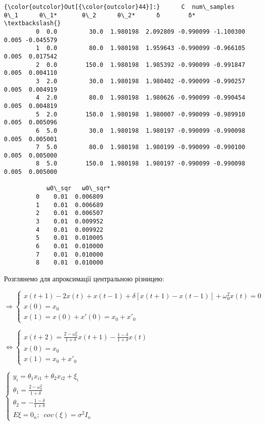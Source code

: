 \documentclass[11pt]{article}
\begin{document}
\begin{Verbatim}[commandchars=\\\{\}]
{\color{outcolor}Out[{\color{outcolor}44}]:}      C  num\_samples       θ\_1      θ\_1*       θ\_2      θ\_2*      δ        δ*  \textbackslash{}
         0  0.0         30.0  1.980198  2.092809 -0.990099 -1.100300  0.005 -0.045579   
         1  0.0         80.0  1.980198  1.959643 -0.990099 -0.966105  0.005  0.017542   
         2  0.0        150.0  1.980198  1.985392 -0.990099 -0.991847  0.005  0.004110   
         3  2.0         30.0  1.980198  1.980402 -0.990099 -0.990257  0.005  0.004919   
         4  2.0         80.0  1.980198  1.980626 -0.990099 -0.990454  0.005  0.004819   
         5  2.0        150.0  1.980198  1.980007 -0.990099 -0.989910  0.005  0.005096   
         6  5.0         30.0  1.980198  1.980197 -0.990099 -0.990098  0.005  0.005001   
         7  5.0         80.0  1.980198  1.980199 -0.990099 -0.990100  0.005  0.005000   
         8  5.0        150.0  1.980198  1.980197 -0.990099 -0.990098  0.005  0.005000   
         
            ω0\_sqr   ω0\_sqr*  
         0    0.01  0.006809  
         1    0.01  0.006689  
         2    0.01  0.006507  
         3    0.01  0.009952  
         4    0.01  0.009922  
         5    0.01  0.010005  
         6    0.01  0.010000  
         7    0.01  0.010000  
         8    0.01  0.010000  
\end{Verbatim}
            
    Розглянемо для апроксимації центральною різницею:

$ \Rightarrow \left \{ \begin{array}{ll}
                            x(t+1)-2x(t)+x(t-1)+\delta[x(t+1)-x(t-1)]+\omega_0^2 x(t)=0 \\
                            x(0) = x_0\\
                            x(1) = x(0) + x'(0) = x_0 + x'_0
                        \end{array} \right. $

$ \iff \left \{ \begin{array}{ll}
                    x(t+2)=\frac{2-\omega_0^2}{1+\delta}x(t+1)-\frac{1-\delta}{1+\delta}x(t) \\
                    x(0) = x_0\\
                    x(1) = x_0 + x'_0
                 \end{array} \right. $

$ \left \{ \begin{array}{ll}
                  y_i = \theta_1 x_{i1} +  \theta_2 x_{i2} + \xi_i\\
                  \theta_1 = \frac{2-\omega_0^2}{1+\delta}\\
                  \theta_2 = -\frac{1-\delta}{1+\delta}\\
                  E\xi = 0_n;\enspace cov(\xi) = \sigma^2I_n
                \end{array}
              \right. $
\end{document}
